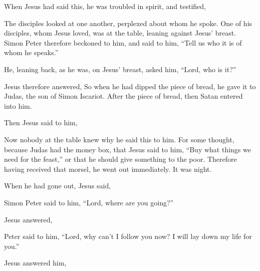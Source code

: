 {{{}}
\par }{\PP {}When Jesus had said this, he was troubled in spirit, and testified,
{}
\par }{\PP {}The disciples looked at one another, perplexed about whom he spoke.
One of his disciples, whom Jesus loved, was at the table, leaning against Jesus’ breast.
Simon Peter therefore beckoned to him, and said to him, “Tell us who it is of whom he speaks.”
\par }{\PP {}He, leaning back, as he was, on Jesus’ breast, asked him, “Lord, who is it?”
\par }{\PP {}Jesus therefore answered,
{} So when he had dipped the piece of bread, he gave it to Judas, the son of Simon Iscariot.
After the piece of bread, then Satan entered into him.
\par }{\PP Then Jesus said to him,
{}
\par }{\PP {}Now nobody at the table knew why he said this to him.
For some thought, because Judas had the money box, that Jesus said to him, “Buy what things we need for the feast,” or that he should give something to the poor.
Therefore having received that morsel, he went out immediately. It was night.
\par }{\PP {}When he had gone out, Jesus said,
{}
\par }{\PP {}Simon Peter said to him, “Lord, where are you going?”
\par }{\PP Jesus answered,
{}
\par }{\PP {}Peter said to him, “Lord, why can’t I follow you now? I will lay down my life for you.”
\par }{\PP {}Jesus answered him,
{}

}
